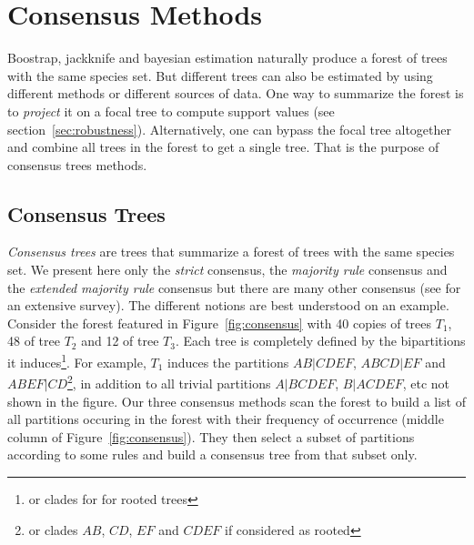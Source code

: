 \section{Consensus Methods} \label{sec:consensus}

Boostrap, jackknife and bayesian estimation naturally produce a forest of trees with the same species set. But different trees can also be estimated by using different methods or different sources of data. One way to summarize the forest is to \emph{project} it on a focal tree to compute support values (see section~\ref{sec:robustness}). Alternatively, one can bypass the focal tree altogether and combine all trees in the forest to get a single tree. That is the purpose of consensus trees methods. 

\subsection{Consensus Trees} \label{sec:consensus-tree}


\emph{Consensus trees} are trees that summarize a forest of trees with the same species set. We present here only the \emph{strict} consensus, the \emph{majority rule} consensus and the \emph{extended majority rule} consensus but there are many other consensus (see \citet{Bryant2003} for an extensive survey). The different notions are best understood on an example. Consider the forest featured in Figure~\ref{fig:consensus} with 40 copies of trees $T_1$, 48 of tree $T_2$ and 12 of tree $T_3$. Each tree is completely defined by the bipartitions it induces\footnote{or clades for for rooted trees}. For example, $T_1$ induces the partitions $AB|CDEF$, $ABCD|EF$ and $ABEF|CD$\footnote{or clades $AB$, $CD$, $EF$ and $CDEF$ if considered as rooted}, in addition to all trivial partitions $A|BCDEF$, $B|ACDEF$, etc not shown in the figure. Our three consensus methods scan the forest to build a list of all partitions occuring in the forest with their frequency of occurrence (middle column of Figure~\ref{fig:consensus}). They then select a subset of partitions according to some rules and build a consensus tree from that subset only. 

